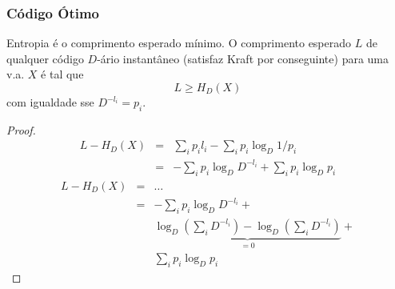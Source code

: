 \begin{frame}[allowframebreaks]
  \frametitle{Código Ótimo}
  \begin{theorem}
  Entropia é o comprimento esperado mínimo. O comprimento esperado $L$ de qualquer código
  $D$-ário instantâneo (satisfaz Kraft por conseguinte) para uma v.a. $X$ é tal que
	\begin{equation}
	L \geq H_D (X)
	\end{equation}
  com igualdade sse $D^{-l_i} = p_i$.
  \end{theorem}

  \framebreak

  \begin{proof}
  \begin{eqnarray}
  L - H_D (X) &=& \sum_i p_i l_i - \sum_i p_i \log_D 1/p_i \nonumber \\
		&=& - \sum_i p_i \log_D D^{-l_i} + \sum_i p_i \log_D p_i 
  \end{eqnarray}
  \proofbreak
  \begin{eqnarray}
  L - H_D (X) &=& \ldots \nonumber \\
		&=& - \sum_i p_i \log_D D^{-l_i} + \nonumber \\
		&& \underbrace{ \log_D \left( \sum_i D^{-l_i} \right) - \log_D \left( \sum_i D^{-l_i} \right)  }_{=0} + \nonumber \\
		&& \sum_i p_i \log_D p_i 
  \end{eqnarray}


\end{proof}
\end{frame}
